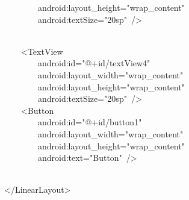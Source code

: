 {\ttfamily\small \ \ \ \ \ \ \ \ android:layout\_height="wrap\_content"} \\
{\ttfamily\small \ \ \ \ \ \ \ \ android:textSize="20sp"\ /\textgreater{}} \\
\strut \\
{\ttfamily\small \ \ \ \ \textless{}TextView} \\
{\ttfamily\small \ \ \ \ \ \ \ \ android:id="@+id/textView4"} \\
{\ttfamily\small \ \ \ \ \ \ \ \ android:layout\_width="wrap\_content"} \\
{\ttfamily\small \ \ \ \ \ \ \ \ android:layout\_height="wrap\_content"} \\
{\ttfamily\small \ \ \ \ \ \ \ \ android:textSize="20sp"\ /\textgreater{}} \\
{\ttfamily\small \ \ \ \ \textless{}Button} \\
{\ttfamily\small \ \ \ \ \ \ \ \ android:id="@+id/button1"} \\
{\ttfamily\small \ \ \ \ \ \ \ \ android:layout\_width="wrap\_content"} \\
{\ttfamily\small \ \ \ \ \ \ \ \ android:layout\_height="wrap\_content"} \\
{\ttfamily\small \ \ \ \ \ \ \ \ android:text="Button"\ /\textgreater{}} \\
\strut \\
{\ttfamily\small \textless{}/LinearLayout\textgreater{}} \\
